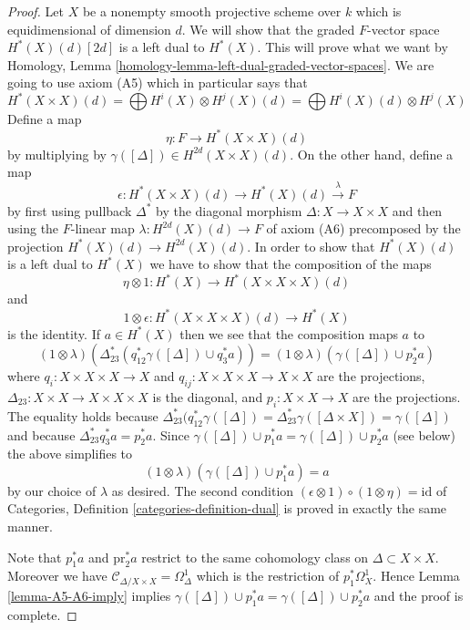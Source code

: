 \documentclass{stacks-project}
\theoremstyle{plain}
\theoremstyle{definition}
\theoremstyle{remark}
\numberwithin{equation}{subsection}
\begin{document}
\begin{proof}
Let $X$ be a nonempty smooth projective scheme over $k$ which is
equidimensional of dimension $d$. We will show that the graded $F$-vector space
$H^*(X)(d)[2d]$ is a left dual to $H^*(X)$. This will prove what we want by
Homology, Lemma \ref{homology-lemma-left-dual-graded-vector-spaces}. We are
going to use axiom (A5) which in particular says that
$$
H^*(X \times X)(d) =
\bigoplus H^i(X) \otimes H^j(X)(d) =
\bigoplus H^i(X)(d) \otimes H^j(X)
$$
Define a map
$$
\eta : F \longrightarrow H^*(X \times X)(d)
$$
by multiplying by $\gamma([\Delta]) \in H^{2d}(X \times X)(d)$.
On the other hand, define a map
$$
\epsilon :
H^*(X \times X)(d) \longrightarrow H^*(X)(d) \xrightarrow{\lambda} F
$$
by first using pullback $\Delta^*$ by the diagonal morphism
$\Delta : X \to X \times X$ and then using the $F$-linear map
$\lambda : H^{2d}(X)(d) \to F$ of axiom (A6) precomposed
by the projection $H^*(X)(d) \to H^{2d}(X)(d)$.
In order to show that $H^*(X)(d)$ is a left dual to $H^*(X)$
we have to show that the composition of the maps
$$
\eta \otimes 1 :
H^*(X) \longrightarrow H^*(X \times X \times X)(d)
$$
and
$$
1 \otimes \epsilon : H^*(X \times X \times X)(d) \longrightarrow H^*(X)
$$
is the identity. If $a \in H^*(X)$ then we see
that the composition maps $a$ to
$$
(1 \otimes \lambda)(\Delta_{23}^*(q_{12}^*\gamma([\Delta]) \cup q_3^*a)) =
(1 \otimes \lambda)(\gamma([\Delta]) \cup p_2^*a)
$$
where $q_i : X \times X \times X \to X$ and
$q_{ij} : X \times X \times X \to X \times X$ are the projections,
$\Delta_{23} : X \times X \to X \times X \times X$ is the diagonal, and
$p_i : X \times X \to X$ are the projections.
The equality holds because $\Delta_{23}^*(q_{12}^*\gamma([\Delta]) =
\Delta_{23}^*\gamma([\Delta \times X]) = \gamma([\Delta])$
and because $\Delta_{23}^* q_3^*a = p_2^*a$.
Since $\gamma([\Delta]) \cup p_1^*a = \gamma([\Delta]) \cup p_2^*a$
(see below) the above simplifies to
$$
(1 \otimes \lambda)(\gamma([\Delta]) \cup p_1^*a) = a
$$
by our choice of $\lambda$ as desired. The second condition
$(\epsilon \otimes 1) \circ (1 \otimes \eta) = \text{id}$
of Categories, Definition \ref{categories-definition-dual}
is proved in exactly the
same manner.

\medskip\noindent
Note that $p_1^*a$ and $\text{pr}_2^*a$ restrict to the same
cohomology class on $\Delta \subset X \times X$. Moreover we
have $\mathcal{C}_{\Delta/X \times X} = \Omega^1_\Delta$ which
is the restriction of $p_1^*\Omega^1_X$. Hence
Lemma \ref{lemma-A5-A6-imply} implies
$\gamma([\Delta]) \cup p_1^*a = \gamma([\Delta]) \cup p_2^*a$
and the proof is complete.
\end{proof}
\end{document}
